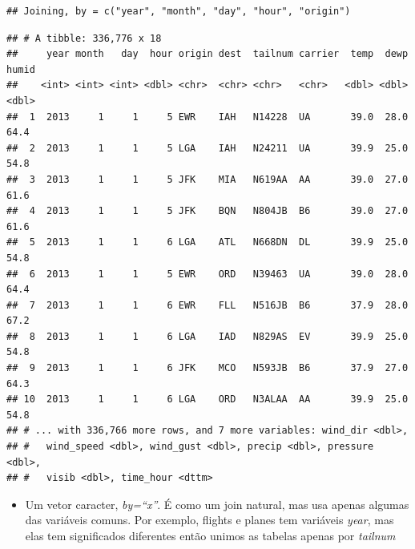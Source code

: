 \documentclass[
]{article}
\newenvironment{Shaded}{\begin{snugshade}}{\end{snugshade}}
\newcommand{\DataTypeTok}[1]{\textcolor[rgb]{0.13,0.29,0.53}{#1}}
\newcommand{\KeywordTok}[1]{\textcolor[rgb]{0.13,0.29,0.53}{\textbf{#1}}}
\newcommand{\NormalTok}[1]{#1}
\newcommand{\OperatorTok}[1]{\textcolor[rgb]{0.81,0.36,0.00}{\textbf{#1}}}
\newcommand{\StringTok}[1]{\textcolor[rgb]{0.31,0.60,0.02}{#1}}
\providecommand{\tightlist}{%
  \setlength{\itemsep}{0pt}\setlength{\parskip}{0pt}}
\begin{document}
\begin{verbatim}
## Joining, by = c("year", "month", "day", "hour", "origin")
\end{verbatim}

\begin{verbatim}
## # A tibble: 336,776 x 18
##     year month   day  hour origin dest  tailnum carrier  temp  dewp humid
##    <int> <int> <int> <dbl> <chr>  <chr> <chr>   <chr>   <dbl> <dbl> <dbl>
##  1  2013     1     1     5 EWR    IAH   N14228  UA       39.0  28.0  64.4
##  2  2013     1     1     5 LGA    IAH   N24211  UA       39.9  25.0  54.8
##  3  2013     1     1     5 JFK    MIA   N619AA  AA       39.0  27.0  61.6
##  4  2013     1     1     5 JFK    BQN   N804JB  B6       39.0  27.0  61.6
##  5  2013     1     1     6 LGA    ATL   N668DN  DL       39.9  25.0  54.8
##  6  2013     1     1     5 EWR    ORD   N39463  UA       39.0  28.0  64.4
##  7  2013     1     1     6 EWR    FLL   N516JB  B6       37.9  28.0  67.2
##  8  2013     1     1     6 LGA    IAD   N829AS  EV       39.9  25.0  54.8
##  9  2013     1     1     6 JFK    MCO   N593JB  B6       37.9  27.0  64.3
## 10  2013     1     1     6 LGA    ORD   N3ALAA  AA       39.9  25.0  54.8
## # ... with 336,766 more rows, and 7 more variables: wind_dir <dbl>,
## #   wind_speed <dbl>, wind_gust <dbl>, precip <dbl>, pressure <dbl>,
## #   visib <dbl>, time_hour <dttm>
\end{verbatim}

\begin{itemize}
\tightlist
\item
  Um vetor caracter, \emph{by=``x''}. É como um join natural, mas usa
  apenas algumas das variáveis comuns. Por exemplo, flights e planes tem
  variáveis \emph{year}, mas elas tem significados diferentes então
  unimos as tabelas apenas por \emph{tailnum}
\end{itemize}

\begin{Shaded}
\end{Shaded}
\end{document}
